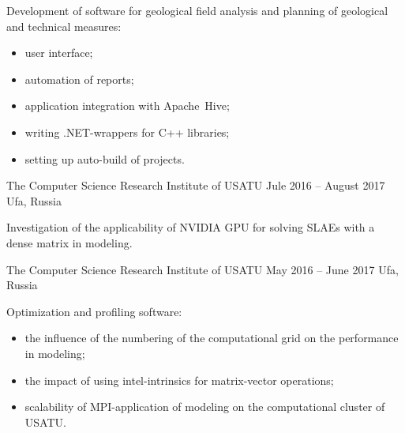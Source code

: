 \documentclass[10pt,a4paper,ragged2e,withhyper]{altacv}
\begin{document}
\begin{paracol}{2}
Development of software for geological field analysis and planning of geological and technical measures:

\begin{itemize}

  \item user interface;
  \smallskip

  \item automation of reports;
  \smallskip

  \item application integration with Apache~Hive;
  \smallskip

  \item writing .NET-wrappers for C++ libraries;
  \smallskip

  \item setting up auto-build of projects.

\end{itemize}

\divider

{The Computer Science Research Institute of USATU}
{Jule 2016 -- August 2017}
{Ufa, Russia}

Investigation of the applicability of NVIDIA GPU for solving SLAEs with a dense matrix in modeling.

\divider

{The Computer Science Research Institute of USATU}
{May 2016 -- June 2017}
{Ufa, Russia}

Optimization and profiling software:

\begin{itemize}

  \item the influence of the numbering of the computational grid on the performance in modeling;
  \smallskip

  \item the impact of using intel-intrinsics for matrix-vector operations;
  \smallskip

  \item scalability of MPI-application of modeling on the computational cluster of USATU.

\end{itemize}

\switchcolumn




\end{paracol}
\end{document}
